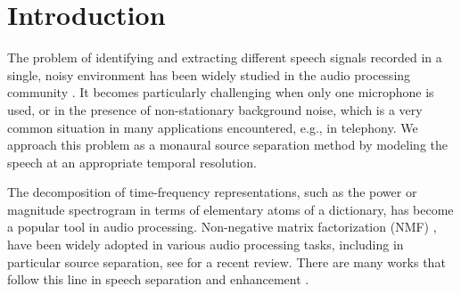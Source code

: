 \section{Introduction}

The problem of identifying and extracting different speech signals 
recorded in a single, noisy environment has been widely
studied in the audio processing community \cite{loizou2007speech,hansler2008speech}. 
It becomes particularly challenging when only one microphone is used, or in the presence of 
non-stationary background noise, which is a very common situation in many applications encountered, e.g., in telephony.
We approach this problem as a monaural source separation method
by modeling the speech at an appropriate temporal resolution.

The decomposition of time-frequency representations, such as the power or magnitude spectrogram
in terms of elementary atoms of a dictionary, has become a popular tool in audio processing. 
Non-negative matrix factorization (NMF) \cite{NMF, smaragdis2006probabilistic},
have been widely adopted in various audio processing tasks, including in particular source separation, see \cite{smaragdis2014static} for a recent review. 
There are many works that follow this line in speech separation \cite{schmidt06speechseparation,shashanka_icassp07} and enhancement \cite{JoderWEVS12,DuanMS12,schmidt07mlsp,mohammadiha2013supervised}. %

%

